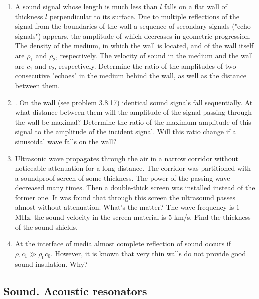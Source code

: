 \documentclass{article}
\begin{document}
\begin{enumerate}[label=3.8.\arabic*]
\item A sound signal whose length is much less than $l$ falls on a flat wall of thickness $l$ perpendicular to its surface. Due to multiple reflections of the signal from the boundaries of the wall a sequence of secondary signals ("echo-signals") appears, the amplitude of which decreases in geometric progression. The density of the medium, in which the wall is located, and of the wall itself are $\rho_1$ and $\rho_2$, respectively. The velocity of sound in the medium and the wall are $c_1$ and $c_2$, respectively. Determine the ratio of the amplitudes of two consecutive "echoes" in the medium behind the wall, as well as the distance between them.

\item . On the wall (see problem 3.8.17) identical sound signals fall sequentially. At what distance between them will the amplitude of the signal passing through the wall be maximal? Determine the ratio of the maximum amplitude of this signal to the amplitude of the incident signal. Will this ratio change if a sinusoidal wave falls on the wall?

\item Ultrasonic wave propagates through the air in a narrow corridor without noticeable attenuation for a long distance. The corridor was partitioned with a soundproof screen of some thickness. The power of the passing wave decreased many times. Then a double-thick screen was installed instead of the former one. It was found that through this screen the ultrasound passes almost without attenuation. What's the matter? The wave frequency is $1$ MHz, the sound velocity in the screen material is $5$ km/s. Find the thickness of the sound shields.

\item At the interface of media almost complete reflection of sound occurs if $\rho_1 c_1 \gg \rho_0 c_0$. However, it is known that very thin walls do not provide good sound insulation. Why?


\end{enumerate}


\subsection{Sound. Acoustic resonators}
\end{document}
